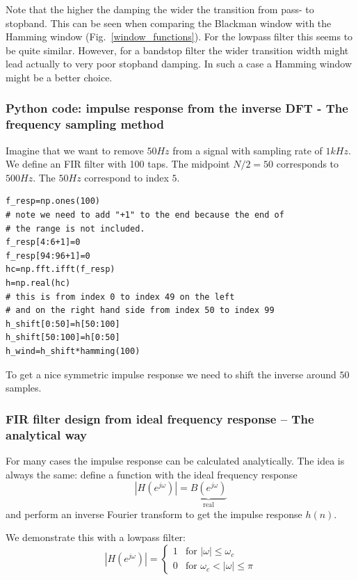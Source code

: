 \documentclass[12pt,a4paper]{article}
\begin{document}
Note that the higher the damping the wider the transition from pass-
to stopband. This can be seen when comparing the Blackman window with
the Hamming window (Fig.~\ref{window_functions}). For the lowpass
filter this seems to be quite similar. However, for a bandstop filter
the wider transition width might lead actually to very poor stopband
damping. In such a case a Hamming window might be a better choice.


\subsubsection{Python code: 
impulse response from the inverse DFT - The frequency sampling
method\label{freqsamp}} Imagine that we want to remove $50Hz$ from a
signal with sampling rate of $1kHz$. We define an FIR filter with 100
taps. The midpoint $N/2=50$ corresponds to $500Hz$. The $50Hz$
correspond to index $5$.
\begin{verbatim}
f_resp=np.ones(100)
# note we need to add "+1" to the end because the end of
# the range is not included.
f_resp[4:6+1]=0
f_resp[94:96+1]=0
hc=np.fft.ifft(f_resp)
h=np.real(hc)
# this is from index 0 to index 49 on the left
# and on the right hand side from index 50 to index 99
h_shift[0:50]=h[50:100]
h_shift[50:100]=h[0:50]
h_wind=h_shift*hamming(100)
\end{verbatim}
To get a nice symmetric impulse response we need to shift the
inverse around $50$ samples.


\subsubsection{FIR filter design from ideal frequency response --
The analytical way
\label{idealFilt}}
For many cases the impulse response can be calculated analytically.
The idea is always the same: define a function with the ideal frequency
response
\begin{equation}
|H(e^{j\omega})| = \underbrace{B(e^{j\omega})}_{\mbox{real}}
\end{equation}
and perform an inverse Fourier transform to get the impulse response
$h(n)$.

We demonstrate this with a lowpass filter:
\begin{equation}
|H(e^{j\omega})| =
\left\{
\begin{array}{ll}
1 & \mbox{for } |\omega| \leq \omega_{c} \\
0 & \mbox{for } \omega_c < |\omega| \leq \pi
\end{array}
\right.
\end{equation}
\end{document}

